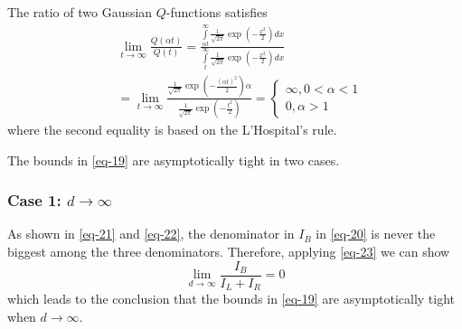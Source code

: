 \documentclass{IEEEtran}
\begin{document}
The ratio of two Gaussian $Q$-functions satisfies
\begin{equation}\label{eq-23}
\begin{split}
&\mathop {\lim }\limits_{t \to \infty } \frac{{Q\left( {\alpha t} \right)}}{{Q\left( t \right)}}= \frac{{\int\limits_{\alpha t}^\infty  {\frac{1}{{\sqrt {2\pi } }}\exp \left( { - \frac{{{x^2}}}{2}} \right)dx} }}{{\int\limits_t^\infty  {\frac{1}{{\sqrt {2\pi } }}\exp \left( { - \frac{{{x^2}}}{2}} \right)dx} }}\\
 &= \mathop {\lim }\limits_{t \to \infty } \frac{{\frac{1}{{\sqrt {2\pi } }}\exp \left( { - \frac{{{{\left( {\alpha t} \right)}^2}}}{2}} \right)\alpha }}{{\frac{1}{{\sqrt {2\pi } }}\exp \left( { - \frac{{{t^2}}}{2}} \right)}}=\left\{ \begin{array}{l}
\infty ,0<\alpha  < 1\\
0,\alpha  > 1
\end{array} \right.
\end{split}
\end{equation}
where  the second equality is based on the L'Hospital's rule.

The bounds in \eqref{eq-19} are asymptotically tight in two cases.

\subsubsection{Case 1: $d \to \infty$} As shown in \eqref{eq-21} and \eqref{eq-22},  the denominator in $I_B$ in \eqref{eq-20} is never the biggest among the three denominators. Therefore, applying \eqref{eq-23} we can show
\begin{equation}\label{eq-24}
  \mathop {\lim }\limits_{d \to \infty } \frac{{{I_B}}}{{{I_L} + {I_R}}} = 0
\end{equation}
which leads to the conclusion that the bounds in  \eqref{eq-19} are asymptotically tight when $d \to \infty$.
\end{document}
